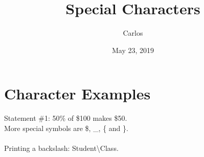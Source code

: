 \documentclass[a4paper,11pt]{article}
\begin{document}
\title{Special Characters}
\author{Carlos}
\date{May 23, 2019}
\maketitle

\section{Character Examples}
Statement \#1:  
50\% of \$100 makes \$50.
\\ %
More special symbols are \$, \_, \{ and \}.
\\ \\ %
Printing a backslash: Student\textbackslash Class.
\end{document}
